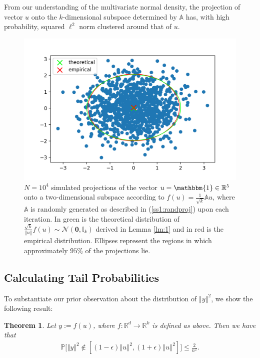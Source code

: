 \documentclass{article}
\newtheorem{theorem}{Theorem}
\begin{document}
    From our understanding of the multivariate normal density, the projection of vector $u$ onto the  $k$-dimensional subspace determined by $\mathbb{A}$ has, with high probability, squared $\ell^2$ norm clustered around that of $u$.
    \begin{figure}[H]
        \centering
        \includegraphics[width=\textwidth]{imgs/projectpts2d.png}
        \caption{$N = 10^4$ simulated projections of the vector $u = \mathbbm{1} \in \mathbb{R}^5$ onto a two-dimensional subspace according to $f(u) = \frac{1}{\sqrt{k}}\mathbb{A}u$, where $\mathbb{A}$ is randomly generated as described in (\ref{ss1:randproj}) upon each iteration. In green is the theoretical distribution of $\frac{\sqrt{k}}{\left \Vert u \right \Vert}f(u) \sim \mathcal{N}(\boldsymbol{0}, \mathbb{I}_k)$ derived in Lemma \ref{lm:1} and in red is the empirical distribution. Ellipses represent the regions in which approximately $95$\% of the projections lie.}
    \end{figure}
    
\subsection{Calculating Tail Probabilities}

To substantiate our prior observation about the distribution of $\left \Vert y \right \Vert^2$, we show the following result:

\begin{theorem}\label{thm:2}
    Let $y:= f(u)$, where $f: \mathbb{R}^d \rightarrow \mathbb{R}^k$ is defined as above. Then we have that 
    \begin{align*}
        \mathbb{P}\bigg[ \left\Vert y \right\Vert^2 \notin \left[(1 - \epsilon)\left\Vert u \right\Vert^2, (1 + \epsilon)\left\Vert u \right\Vert^2 \right] \bigg] \leq \frac{2}{n^2}.
    \end{align*}
\end{theorem}
\end{document}
